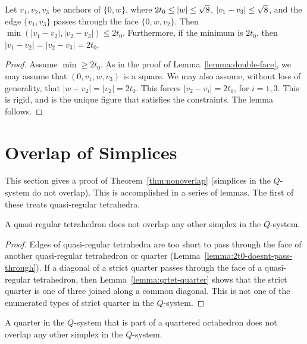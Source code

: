 \begin{lemma} \label{lemma:pass-makes-quarter}
Let $v_1,v_2,v_3$ be anchors of $\{0,w\}$, where
$2t_0\le|w|\le\sqrt8$, $|v_1-v_3|\le\sqrt8$, and the edge
$\{v_1,v_3\}$ passes through the face $\{0,w,v_2\}$.  Then
$\min(|v_1-v_2|,|v_2-v_3|)\le2t_0$. Furthermore, if the minimum is
$2t_0$, then $|v_1-v_2|=|v_2-v_3|=2t_0$.
\end{lemma}

\begin{proof}
Assume $\min\ge2t_0$. As in the proof of
Lemma~\ref{lemma:double-face}, we may assume that $(0,v_1,w,v_3)$
is a square.  We may also assume, without loss of generality, that
$|w-v_2|=|v_2|=2t_0$. This forces $|v_2-v_i|=2t_0$, for $i=1,3$.
This is rigid,  and is the unique figure that satisfies the
constraints. The lemma follows.
\end{proof}


\bigskip

\section{Overlap of Simplices}
\label{sec:nonoverlap}

This section gives a proof of Theorem~\ref{thm:nonoverlap}
(simplices in the $Q$-system do not overlap).  This is accomplished
in a series of lemmas.  The first of these treats quasi-regular
tetrahedra.


\begin{lemma} \label{lemma:qrtet-over}
A quasi-regular tetrahedron does not overlap any
other simplex in the $Q$-system.
\end{lemma}

\begin{proof} Edges of quasi-regular tetrahedra are too short to
pass through the face of another quasi-regular tetrahedron or
quarter (Lemma~\ref{lemma:2t0-doesnt-pass-through}).  If a
diagonal of a strict quarter passes through the face of a
quasi-regular tetrahedron, then Lemma~\ref{lemma:qrtet-quarter}
shows that the strict quarter is one of three joined along a
common diagonal.  This is not one of the enumerated types of
strict quarter in the $Q$-system.
\end{proof}

\begin{lemma} \label{lemma:oct-over}
A quarter in the $Q$-system that is part of a
quartered octahedron does not overlap any other simplex in the
$Q$-system.
\end{lemma}

